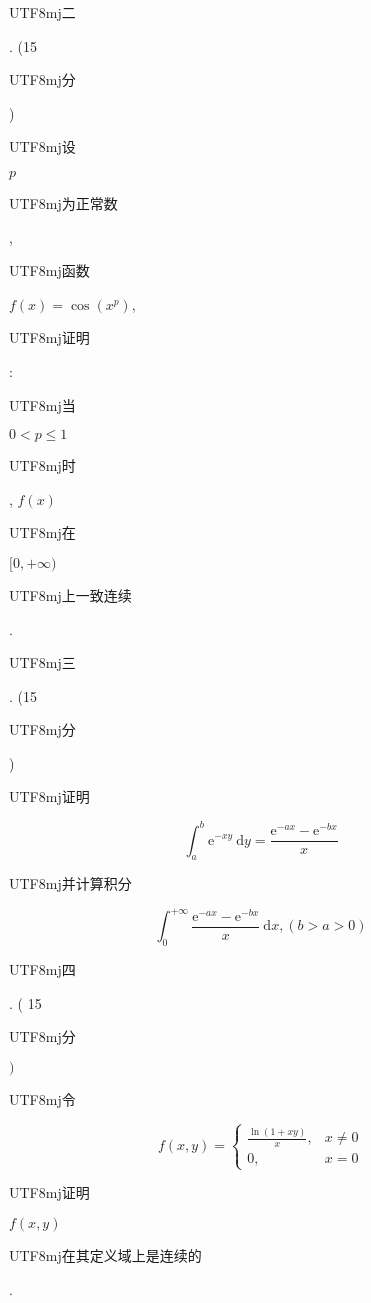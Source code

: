 \documentclass[10pt]{article}
\begin{document}
\begin{CJK}{UTF8}{mj}二\end{CJK}. (15 \begin{CJK}{UTF8}{mj}分\end{CJK}) \begin{CJK}{UTF8}{mj}设\end{CJK} $p$ \begin{CJK}{UTF8}{mj}为正常数\end{CJK}, \begin{CJK}{UTF8}{mj}函数\end{CJK} $f(x)=\cos \left(x^{p}\right)$, \begin{CJK}{UTF8}{mj}证明\end{CJK}: \begin{CJK}{UTF8}{mj}当\end{CJK} $0<p \leq 1$ \begin{CJK}{UTF8}{mj}时\end{CJK}, $f(x)$ \begin{CJK}{UTF8}{mj}在\end{CJK} $[0,+\infty)$ \begin{CJK}{UTF8}{mj}上一致连续\end{CJK}.

\begin{CJK}{UTF8}{mj}三\end{CJK}. (15 \begin{CJK}{UTF8}{mj}分\end{CJK}) \begin{CJK}{UTF8}{mj}证明\end{CJK}
$$
\int_{a}^{b} \mathrm{e}^{-x y} \mathrm{~d} y=\frac{\mathrm{e}^{-a x}-\mathrm{e}^{-b x}}{x}
$$
\begin{CJK}{UTF8}{mj}并计算积分\end{CJK}
$$
\int_{0}^{+\infty} \frac{\mathrm{e}^{-a x}-\mathrm{e}^{-b x}}{x} \mathrm{~d} x,(b>a>0)
$$
\begin{CJK}{UTF8}{mj}四\end{CJK}. ( 15 \begin{CJK}{UTF8}{mj}分\end{CJK} $)$ \begin{CJK}{UTF8}{mj}令\end{CJK}
$$
f(x, y)= \begin{cases}\frac{\ln (1+x y)}{x}, & x \neq 0 \\ 0, & x=0\end{cases}
$$
\begin{CJK}{UTF8}{mj}证明\end{CJK} $f(x, y)$ \begin{CJK}{UTF8}{mj}在其定义域上是连续的\end{CJK}.
\end{document}

